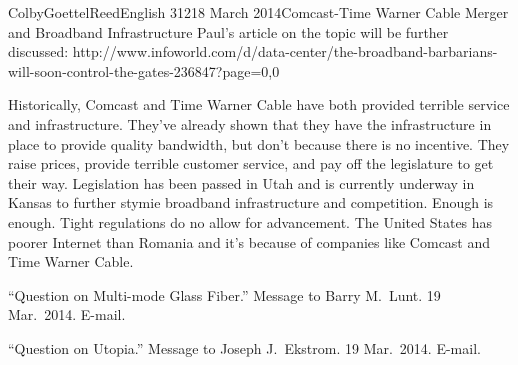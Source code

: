 \documentclass[12pt]{article}
\begin{document}
\begin{mla}{Colby}{Goettel}{Reed}{English 312}{18 March 2014}{Comcast-Time Warner Cable Merger and Broadband Infrastructure}
Paul's article on the topic will be further discussed: http://www.infoworld.com/d/data-center/the-broadband-barbarians-will-soon-control-the-gates-236847?page=0,0

Historically, Comcast and Time Warner Cable have both provided terrible service and infrastructure. They've already shown that they have the infrastructure in place to provide quality bandwidth, but don't because there is no incentive. They raise prices, provide terrible customer service, and pay off the legislature to get their way. Legislation has been passed in Utah and is currently underway in Kansas to further stymie broadband infrastructure and competition. Enough is enough. Tight regulations do no allow for advancement. The United States has poorer Internet than Romania and it's because of companies like Comcast and Time Warner Cable.

\begin{workscited}
    \bibent ``Question on Multi-mode Glass Fiber.'' Message to Barry M.\ Lunt. 19 Mar.\ 2014. E-mail.
    
    \bibent ``Question on Utopia.'' Message to Joseph J.\ Ekstrom. 19 Mar.\ 2014. E-mail.
\end{workscited}

\end{mla}
\end{document}
